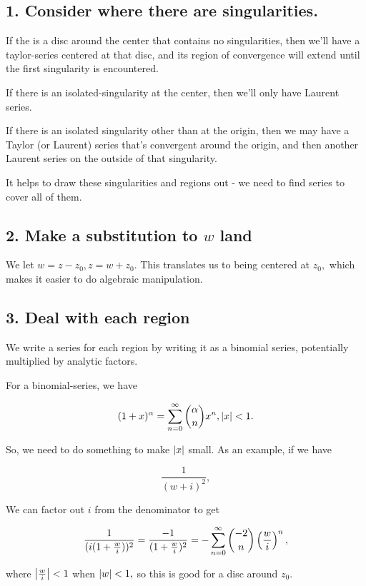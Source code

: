 \documentclass{article}
\begin{document}
\subsection{1. Consider where there are singularities.}

If the is a disc around the center that contains no singularities, then we'll have a \@{taylor-series} centered at that disc, and its region of convergence will extend until the first \@{singularity} is encountered.

If there is an \@{isolated-singularity} at the center, then we'll only have Laurent series.

If there is an isolated singularity other than at the origin, then we may have a Taylor (or Laurent) series that's convergent around the origin, and then another Laurent series on the outside of that singularity.

It helps to draw these singularities and regions out - we need to find series to cover all of them.

\subsection{2. Make a substitution to $w$ land}

We let $w = z - z_0, z = w + z_0.$ This translates us to being centered at $z_0,$ which makes it easier to do algebraic manipulation.

\subsection{3. Deal with each region}

We write a series for each region by writing it as a binomial series, potentially multiplied by analytic factors.

For a \@{binomial-series}, we have

\[ (1 + x)^{\alpha} = \sum_{n=0}^{\infty}\binom{\alpha}{n}x^n, \left| x \right| < 1. \]

So, we need to do something to make $\left| x \right|$ small. As an example, if we have

\[ \frac{1}{(w+i)^{2}}, \]

We can factor out $i$ from the denominator to get

\[ \frac{1}{(i(1+\frac{w}{i}))^2} = \frac{-1}{(1+\frac{w}{i})^2} = - \sum_{n=0}^{\infty} \binom{-2}{n} \left(\frac{w}{i}\right)^n, \]

where $\left| \frac{w}{i} \right| < 1$ when $\left| w \right| < 1,$ so this is good for a disc around $z_0.$
\end{document}
